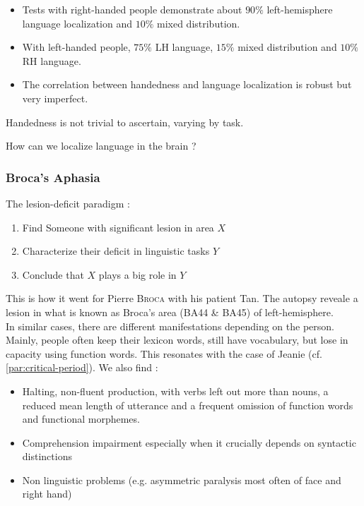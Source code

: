 \documentclass{cours}
\begin{document}
\begin{itemize}
    \item Tests with right-handed people demonstrate about $90\%$ left-hemisphere language localization and $10\%$ mixed distribution. 
    \item With left-handed people, $75\%$ LH language, $15\%$ mixed distribution and $10\%$ RH language.
    \item The correlation between handedness and language localization is robust but very imperfect.
\end{itemize}
Handedness is not trivial to ascertain, varying by task. 

How can we localize language in the brain ? 

\subsubsection{Broca's Aphasia}
The lesion-deficit paradigm : 
\begin{enumerate}
    \item Find Someone with significant lesion in area $X$
    \item Characterize their deficit in linguistic tasks $Y$
    \item Conclude that $X$ plays a big role in $Y$
\end{enumerate}
This is how it went for Pierre \textsc{Broca} with his patient Tan. The autopsy reveale a lesion in what is known as Broca's area (BA44 \& BA45) of left-hemisphere.\\
In similar cases, there are different manifestations depending on the person. Mainly, people often keep their lexicon words, still have vocabulary, but lose in capacity using function words. This resonates with the case of Jeanie (cf. \ref{par:critical-period}). We also find : 
\begin{itemize}
    \item Halting, non-fluent production, with verbs left out more than nouns, a reduced mean length of utterance and a frequent omission of function words and functional morphemes.
    \item Comprehension impairment especially when it crucially depends on syntactic distinctions
    \item Non linguistic problems (e.g. asymmetric paralysis most often of face and right hand)
\end{itemize}
\end{document}
